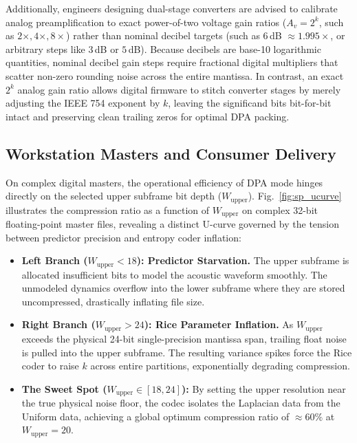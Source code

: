 \documentclass[10pt,twocolumn]{article}
\begin{document}
Additionally, engineers designing dual-stage converters are advised to calibrate analog preamplification to exact power-of-two voltage gain ratios ($A_v = 2^k$, such as $2\times, 4\times, 8\times$) rather than nominal decibel targets (such as $6$\,dB $\approx 1.995\times$, or arbitrary steps like $3$\,dB or $5$\,dB). Because decibels are base-10 logarithmic quantities, nominal decibel gain steps require fractional digital multipliers that scatter non-zero rounding noise across the entire mantissa. In contrast, an exact $2^k$ analog gain ratio allows digital firmware to stitch converter stages by merely adjusting the IEEE 754 exponent by $k$, leaving the significand bits bit-for-bit intact and preserving clean trailing zeros for optimal DPA packing.

\subsection{Workstation Masters and Consumer Delivery}
On complex digital masters, the operational efficiency of DPA mode hinges directly on the selected upper subframe bit depth ($W_{\text{upper}}$). Fig.~\ref{fig:sp_ucurve} illustrates the compression ratio as a function of $W_{\text{upper}}$ on complex 32-bit floating-point master files, revealing a distinct U-curve governed by the tension between predictor precision and entropy coder inflation:

\begin{itemize}
	\item \textbf{Left Branch ($W_{\text{upper}} < 18$): Predictor Starvation.} The upper subframe is allocated insufficient bits to model the acoustic waveform smoothly. The unmodeled dynamics overflow into the lower subframe where they are stored uncompressed, drastically inflating file size.
	\item \textbf{Right Branch ($W_{\text{upper}} > 24$): Rice Parameter Inflation.} As $W_{\text{upper}}$ exceeds the physical 24-bit single-precision mantissa span, trailing float noise is pulled into the upper subframe. The resulting variance spikes force the Rice coder to raise $k$ across entire partitions, exponentially degrading compression.
	\item \textbf{The Sweet Spot ($W_{\text{upper}} \in [18, 24]$):} By setting the upper resolution near the true physical noise floor, the codec isolates the Laplacian data from the Uniform data, achieving a global optimum compression ratio of $\approx 60\%$ at $W_{\text{upper}}=20$.
\end{itemize}
\end{document}
